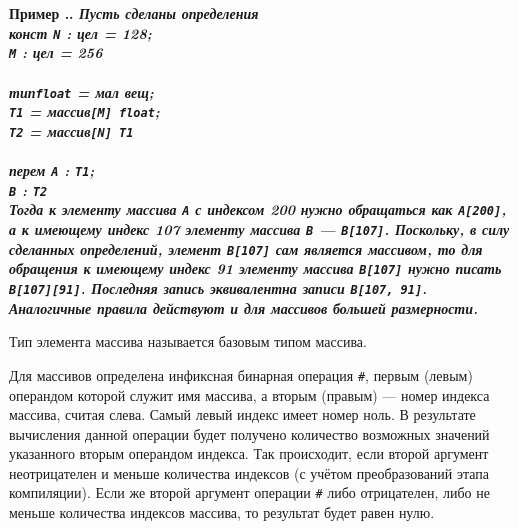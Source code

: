 \documentclass[10pt]{report}
\newcounter{exam}[section]
\renewcommand{\theexam}{\thesection.\arabic{exam}}
\newenvironment{Example}{\par\refstepcounter{exam}\bf Пример \theexam. \sl}{\rm\par}
\begin{document}
\begin{Example} \textit{Пусть сделаны определения}\\
	\rm
	\textbf{конст} \texttt{N} : \textbf{цел} = 128;\\
	\hspace*{10mm} \texttt{M} : \textbf{цел} = 256\\
	\\
	\textbf{тип}\hspace*{5mm}\texttt{float} = \textbf{мал вещ};\\
	\hspace*{12mm}\texttt{T1} = \textbf{массив}\texttt{[M] float};\\
	\hspace*{12mm}\texttt{T2} = \textbf{массив}\texttt{[N] T1}\\
	\\
	\textbf{перем} \texttt{A} : \texttt{T1};\\
	\hspace*{11mm} \texttt{B} : \texttt{T2}
	\\
	\textit{Тогда к элементу массива \texttt{A} с индексом 200 нужно обращаться как \texttt{A[200]}, а к имеющему индекс 107 элементу массива \texttt{B} --- \texttt{B[107]}.
		Поскольку, в силу сделанных определений, элемент \texttt{B[107]} сам является массивом, то для обращения к имеющему индекс 91 элементу массива \texttt{B[107]} нужно писать
		\texttt{B[107][91]}. Последняя запись эквивалентна записи \texttt{B[107, 91]}. Аналогичные правила действуют и для массивов большей размерности.}
\end{Example}
       
Тип элемента массива называется базовым типом массива.

Для массивов определена инфиксная бинарная операция \texttt{\#}, первым (левым) операндом которой служит имя массива, а вторым (правым) --- номер индекса массива, считая слева.
Самый левый индекс имеет номер ноль. В результате вычисления данной операции будет получено количество возможных значений указанного вторым операндом индекса. Так происходит,
если второй аргумент неотрицателен и меньше количества индексов (с учётом преобразований этапа компиляции). Если же второй аргумент операции \texttt{\#} либо отрицателен, либо
не меньше количества индексов массива, то результат будет равен нулю.
\end{document}
